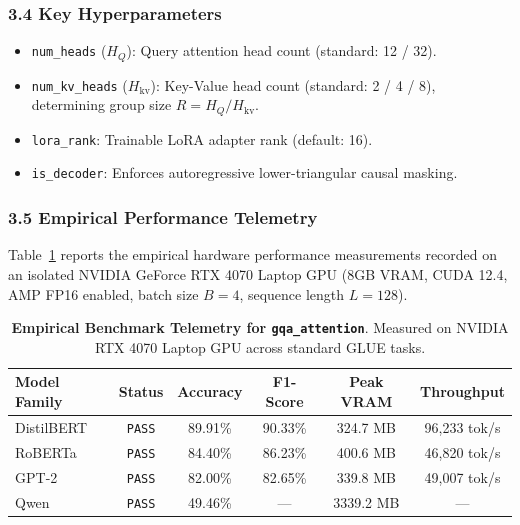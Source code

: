 \subsubsection*{3.4 Key Hyperparameters}
\begin{itemize}
    \item \texttt{num\_heads} ($H_Q$): Query attention head count (standard: 12 / 32).
    \item \texttt{num\_kv\_heads} ($H_{\text{kv}}$): Key-Value head count (standard: 2 / 4 / 8), determining group size $R = H_Q / H_{\text{kv}}$.
    \item \texttt{lora\_rank}: Trainable LoRA adapter rank (default: 16).
    \item \texttt{is\_decoder}: Enforces autoregressive lower-triangular causal masking.
\end{itemize}

\subsubsection*{3.5 Empirical Performance Telemetry}
Table~\ref{tab:telemetry_gqa_attention} reports the empirical hardware performance measurements recorded on an isolated NVIDIA GeForce RTX 4070 Laptop GPU (8GB VRAM, CUDA 12.4, AMP FP16 enabled, batch size $B=4$, sequence length $L=128$).

\begin{table}[h]
\centering
\small
\caption{\textbf{Empirical Benchmark Telemetry for \texttt{gqa\_attention}}. Measured on NVIDIA RTX 4070 Laptop GPU across standard GLUE tasks.}
\label{tab:telemetry_gqa_attention}
\begin{tabular*}{\columnwidth}{@{\extracolsep{\fill}}lccccc}
\toprule
\textbf{Model Family} & \textbf{Status} & \textbf{Accuracy} & \textbf{F1-Score} & \textbf{Peak VRAM} & \textbf{Throughput} \\
\midrule
DistilBERT & \texttt{PASS} & 89.91\% & 90.33\% & 324.7 MB & 96,233 tok/s \\
RoBERTa & \texttt{PASS} & 84.40\% & 86.23\% & 400.6 MB & 46,820 tok/s \\
GPT-2 & \texttt{PASS} & 82.00\% & 82.65\% & 339.8 MB & 49,007 tok/s \\
Qwen & \texttt{PASS} & 49.46\% & --- & 3339.2 MB & --- \\
\bottomrule
\end{tabular*}
\end{table}

